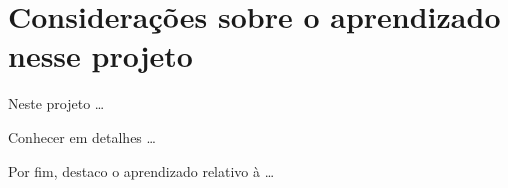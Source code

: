 
\section{Considerações sobre o aprendizado nesse projeto}

Neste projeto \dots

Conhecer em detalhes \dots

Por fim, destaco o aprendizado relativo à \dots
